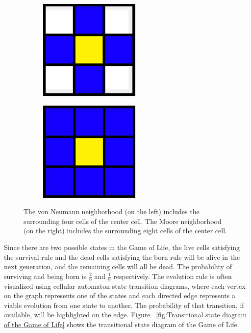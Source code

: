 \documentclass[12pt]{article}
\numberwithin{figure}{section} %
\begin{document}
\begin{figure}[H]
	\begin{subfigure}{0.48\textwidth}
     		\centering
     		\includegraphics[width=.6\linewidth]{Section1/1}
   	\end{subfigure}\hfill
   	\begin{subfigure}{0.48\textwidth}
     		\centering
     		\includegraphics[width=.6\linewidth]{Section1/2}
   	\end{subfigure}
   	\caption[Neighborhood configuration]{The von Neumann neighborhood (on the left) includes the surrounding four cells of the center cell. The Moore neighborhood (on the right) includes the surrounding eight cells of the center cell.}
   	\vspace{-1.5em}
   	\label{fig:Neighborhood configuration}
\end{figure}

Since there are two possible states in the Game of Life, the live cells satisfying the survival rule and the dead cells satisfying the born rule will be alive in the next generation, and the remaining cells will all be dead. The probability of surviving and being born is $\frac{2}{9}$ and $\frac{1}{9}$ respectively. The evolution rule is often visualized using cellular automaton state transition diagrams, where each vertex on the graph represents one of the states and each directed edge represents a viable evolution from one state to another. The probability of that transition, if available, will be highlighted on the edge. Figure ~\ref{fig:Transitional state diagram of the Game of Life} shows the transitional state diagram of the Game of Life. 
\end{document}
